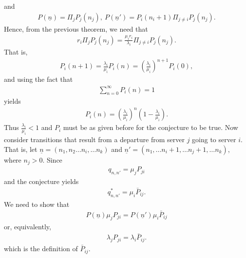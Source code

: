 \documentclass[a4paper,10pt,english]{article}
\begin{document}
 and 
 \begin{align*}
 P(\underline{n})=\Pi_j P_j(n_j),~ P(\underline{n}')=P_i(n_i+1)\Pi_{j \neq i}P_j(n_j).
 \end{align*}
 Hence, from the previous theorem, we need that
 \begin{align*}
  r_i \Pi_j P_j(n_j)= \frac{\mu_i r_i}{\lambda_i}\Pi_{j \neq i}P_j(n_j).
 \end{align*} 
 That is,
 \begin{align*}
 P_i(n+1)= \frac{\lambda_i}{\mu_i}P_i(n)={(\frac{\lambda_i}{\mu_i})}^{n+1}P_i(0),
 \end{align*}
 and using the fact that 
 \begin{align*}
\sum_{n=0}^{\infty}P_i(n)=1
 \end{align*}
 yields 
 \begin{align*}
P_i(n) ={(\frac{\lambda_i}{\mu_i})}^n(1-\frac{\lambda_i}{\mu_i}).
\end{align*}
Thus $\frac{\lambda_i}{\mu_i}< 1$ and $P_i$ must be as given before for the conjecture to be true. Now consider transitions that result from a departure from server $j$ going to server $i$. That is, let $\underline{n}=(n_1,n_2 \hdots n_i, \hdots n_k)$ and $\underline{n}'=(n_1,\hdots n_i+1,\hdots n_j+1,\hdots n_k)$, where $n_j >0$. Since
\begin{align*}
q_{n,n'}=\mu_j P_{ji}
\end{align*}
and the conjecture yields
\begin{align*}
q_{n,n'}^*=\mu_i \bar{P}_{ij}.
\end{align*}
We need to show that 
\begin{align*}
P(\underline{n})\mu_j P_{ji}= P(\underline{n}')\mu_i \bar{P}_{ij}
\end{align*}
or, equivalently,
\begin{align*}
\lambda_j P_{ji}=\lambda_i \bar{P}_{ij}.
\end{align*}
which is the definition of $\bar{P}_{ij}$.
\end{document}
